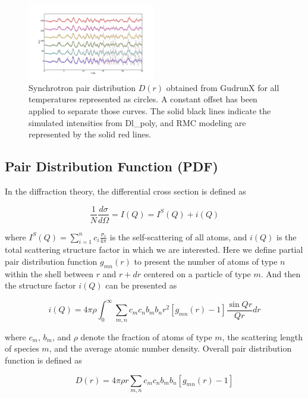 \documentclass[twoside,twocolumn,9pt]{article}
\begin{document}
\begin{figure}
\centering
\includegraphics[width=0.5\textwidth]{Pics/xpdf.pdf}
\caption{Synchrotron pair distribution $D(r)$ obtained from GudrunX for all temperatures represented as circles.
 A constant offset has been applied to separate those curves.
 The solid black lines indicate the  simulated intensities from Dl\_poly, and RMC modeling are represented by the solid red lines.
 }
\label{fig:xpdf}
\end{figure}

\subsection{Pair Distribution Function (PDF)}
In the diffraction theory, the differential cross section is defined as

\begin{equation}
\frac{1}{N}\frac{d\sigma}{d\Omega}=I(Q)=I^{S}(Q)+i(Q)
\end{equation}

where $I^{S}(Q)=\sum_{i=1}^{n}c_i\frac{\sigma_{i}}{4\pi}$ is the self-scattering of all atoms,
and $i(Q)$ is the total scattering structure factor in which we are interested. Here we define partial pair
distribution function $g_{mn}(r)$ to present the number of atoms of type $n$ within the shell between $r$ and  $r+dr$ centered on a particle of type $m$.
And then the structure factor $i(Q)$ can be presented as

\begin{equation}
i(Q)=4\pi\rho\int^{\infty}_{0}\sum_{m,n}c_m c_n b_m b_n r^2 [g_{mn}(r)-1]\frac{\sin{Qr}}{Qr}dr
\end{equation}

where $c_m$, $b_m$, and $\rho$ denote the fraction of atoms of type $m$, the  scattering length of species $m$, and the average atomic number density.
Overall pair distribution function is defined as

\begin{equation}\label{fun:dofr_0}
D(r)=4\pi\rho r \sum_{m,n}c_m c_n b_m b_n [g_{mn}(r)-1]
\end{equation}
\end{document}
